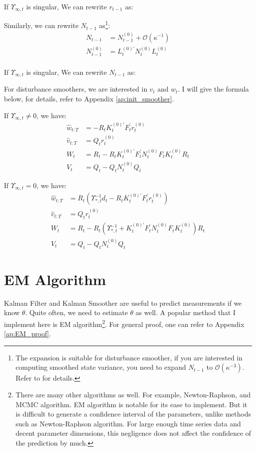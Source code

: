 \documentclass[12pt]{article}
\numberwithin{equation}{section}
\begin{document}
If $\Upsilon_{\infty,t}$ is singular, We can rewrite $r_{t-1}$ as:


Similarly, we can rewrite $N_{t-1}$ as\footnote{The expansion is suitable for disturbance smoother, if you are interested in computing smoothed  state variance, you need to expand $N_{t-1}$ to $\mathcal{O}(\kappa^{-3})$. Refer to \cite{durbin_koopman_2003} for details.}:
\begin{align*}
    N_{t-1} &= N_{t-1}^{(0)} + \mathcal{O}(\kappa^{-1}) \\
    N_{t-1}^{(0)} &= L_t^{(0)'}N_t^{(0)}L_t^{(0)} \\
\end{align*}

If $\Upsilon_{\infty,t}$ is singular, We can rewrite $N_{t-1}$ as:

For disturbance smoothers, we are interested in $v_t$ and $w_t$. I will give the formula below, for details, refer to Appendix \ref{ap:init_smoother}.

If $\Upsilon_{\infty,t} \neq 0$, we have:
\begin{align}
    \hat{w}_{t:T} &= -R_tK_t^{(0)'}F_t^{'}r_t^{(0)} \\
    \hat{v}_{t:T} &= Q_tr_t^{(0)} \\
    W_t &= R_t - R_tK_t^{(0)'}F_t^{'}N_t^{(0)}F_tK_t^{(0)}R_t \\
    V_t &= Q_t - Q_tN_t^{(0)}Q_t
\end{align}

If $\Upsilon_{\infty,t} = 0$, we have:
\begin{align}
    \hat{w}_{t:T} &= R_t(\Upsilon_{*,t}^{-1}d_t - R_tK_t^{(0)'}F_t^{'}r_t^{(0)}) \\
    \hat{v}_{t:T} &= Q_tr_t^{(0)} \\
    W_t &= R_t - R_t(\Upsilon_{*,t}^{-1} + K_t^{(0)'}F_t^{'}N_t^{(0)}F_tK_t^{(0)})R_t \\
    V_t &= Q_t - Q_tN_t^{(0)}Q_t
\end{align}

\section{EM Algorithm} \label{sec:EM}
Kalman Filter and Kalman Smoother are useful to predict measurements if we know $\theta$. Quite often, we need to estimate $\theta$ as well. A popular method that I implement here is EM algorithm\footnote{There are many other algorithms as well. For example, Newton-Raphson, and MCMC algorithm. EM algorithm is notable for its ease to implement. But it is difficult to generate a confidence interval of the parameters, unlike methods such as Newton-Raphson algorithm. For large enough time series data and decent parameter dimensions, this negligence does not affect the confidence of the prediction by much.}. For general proof, one can refer to Appendix \ref{ap:EM_proof}.
\end{document}
